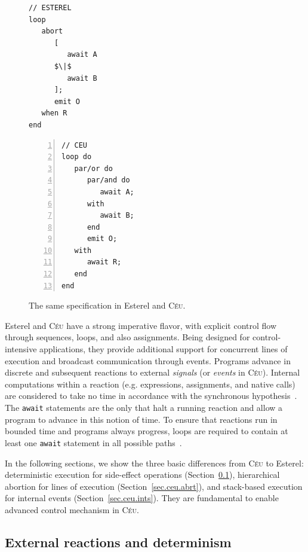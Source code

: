 \documentclass{acm_proc_article-sp}
\newcommand{\CEU}{\textsc{C\'{e}u}\xspace}
\newcommand{\code}[1] {{\small{\texttt{#1}}}}
\newcommand{\1}{\;}
\newcommand{\2}{\;\;}
\newcommand{\3}{\;\;\;}
\newcommand{\5}{\;\;\;\;\;}
\begin{document}
\begin{figure}[t]
\begin{minipage}[t]{0.44\linewidth}
\begin{lstlisting}[mathescape=true]
// ESTEREL
loop
   abort
      [
         await A
      $\|$
         await B
      ];
      emit O
   when R
end
\end{lstlisting}
\end{minipage}
%
\begin{minipage}[t]{0.55\linewidth}
\begin{lstlisting}[numbers=left,xleftmargin=3.5em]
// CEU
loop do
   par/or do
      par/and do
         await A;
      with
         await B;
      end
      emit O;
   with
      await R;
   end
end
\end{lstlisting}
\end{minipage}
\caption{ The same specification in Esterel and \CEU. %
{\small
}
\label{lst.abro}
}
\end{figure}

Esterel and \CEU have a strong imperative flavor, with explicit control flow 
through sequences, loops, and also assignments.
Being designed for control-intensive applications, they provide additional 
support for concurrent lines of execution and broadcast communication through 
events.
%
Programs advance in discrete and subsequent reactions to external 
\emph{signals} (or \emph{events} in \CEU).
Internal computations within a reaction (e.g. expressions, assignments, and 
native calls) are considered to take no time in accordance with the synchronous 
hypothesis~\cite{rp.hypothesis}.
The \code{await} statements are the only that halt a running reaction and allow 
a program to advance in this notion of time.
%
To ensure that reactions run in bounded time and programs always progress, 
loops are required to contain at least one \code{await} statement in all 
possible paths~\cite{ceu.sensys,esterel.primer}.

In the following sections, we show the three basic differences from \CEU to 
Esterel: deterministic execution for side-effect operations 
(Section~\ref{sec.ceu.det}), hierarchical abortion for lines of execution 
(Section~\ref{sec.ceu.abrt}), and stack-based execution for internal events 
(Section~\ref{sec.ceu.ints}).
%
They are fundamental to enable advanced control mechanism in \CEU.

\subsection{External reactions and determinism}
\label{sec.ceu.det}
\end{document}
